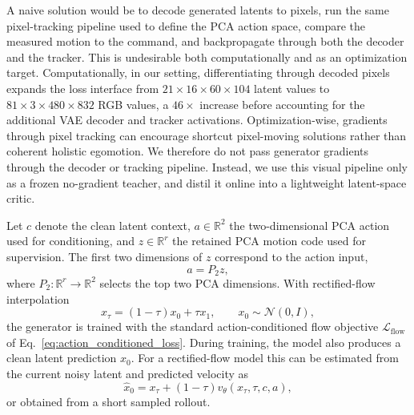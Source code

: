 \documentclass[letterpaper]{article} %
\begin{document}
A naive solution would be to decode generated latents to pixels, run the same pixel-tracking pipeline used to define the PCA action space, compare the measured motion to the command, and backpropagate through both the decoder and the tracker. This is undesirable both computationally and as an optimization target. Computationally, in our setting, differentiating through decoded pixels expands the loss interface from \(21\times16\times60\times104\) latent values to \(81\times3\times480\times832\) RGB values, a \(46\times\) increase before accounting for the additional VAE decoder and tracker activations. Optimization-wise, gradients through pixel tracking can encourage shortcut pixel-moving solutions rather than coherent holistic egomotion. We therefore do not pass generator gradients through the decoder or tracking pipeline. Instead, we use this visual pipeline only as a frozen no-gradient teacher, and distil it online into a lightweight latent-space critic.

Let \(c\) denote the clean latent context, \(a\in\mathbb{R}^2\) the two-dimensional PCA action used for conditioning, and \(z\in\mathbb{R}^{r}\) the retained PCA motion code used for supervision. The first two dimensions of \(z\) correspond to the action input,
\begin{equation}
    a = P_2 z,
\end{equation}
where \(P_2:\mathbb{R}^{r}\to\mathbb{R}^{2}\) selects the top two PCA dimensions. With rectified-flow interpolation
\begin{equation}
    x_\tau=(1-\tau)x_0+\tau x_1,
    \qquad
    x_0\sim\mathcal{N}(0,I),
\end{equation}
the generator is trained with the standard action-conditioned flow objective $\mathcal{L}_{\mathrm{flow}}$ of Eq.~\eqref{eq:action_conditioned_loss}. During training, the model also produces a clean latent prediction \(\hat{x}_0\). For a rectified-flow model this can be estimated from the current noisy latent and predicted velocity as
\begin{equation}
    \hat{x}_0
    =
    x_\tau + (1-\tau)v_\theta(x_\tau,\tau,c,a),
    \label{eq:predicted_clean_latent}
\end{equation}
or obtained from a short sampled rollout.
\end{document}
